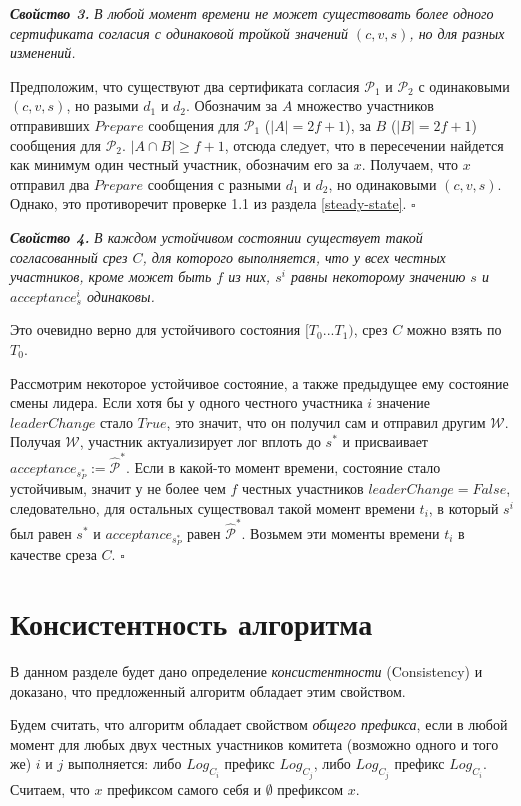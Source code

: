 \textbf{\textit{Свойство 3.}} \textit{В любой момент времени не может существовать более одного сертификата согласия с одинаковой тройкой значений $(c, v, s)$, но для разных изменений.} 

Предположим, что существуют два сертификата согласия $\mathcal{P}_1$ и $\mathcal{P}_2$ с одинаковыми $(c, v, s)$, но разыми $d_1$ и $d_2$. 
Обозначим за $A$ множество участников отправивших $Prepare$ сообщения для  $\mathcal{P}_1$ ($|A|=2f+1$), за $B$ ($|B|=2f+1$) сообщения для $\mathcal{P}_2$. $|A \cap B| \ge f+1$, отсюда следует, что в пересечении найдется как минимум один честный участник,  обозначим его за $x$. Получаем, что $x$ отправил два $Prepare$ сообщения с разными $d_1$ и $d_2$, но одинаковыми $(c, v, s)$. Однако, это противоречит проверке 1.1 из раздела \ref{steady-state}. $\square$
\vspace{10pt}

\textbf{\textit{Свойство 4.}} \textit{В каждом устойчивом состоянии существует такой согласованный срез $C$, для которого выполняется, что у всех честных участников, кроме может быть $f$ из них, $s^i$ равны некоторому значению $s$ и $acceptance^i_s$ одинаковы.}

Это очевидно верно для устойчивого состояния $[T_0...T_1)$, срез $C$ можно взять по $T_0$.

Рассмотрим некоторое устойчивое состояние, а также предыдущее ему состояние смены лидера.
Если хотя бы у одного честного участника $i$ значение $leaderChange$ стало $True$, это значит, что он получил сам и отправил другим $\mathcal{W}$. Получая $\mathcal{W}$, участник актуализирует лог вплоть до $s^{*}$ и присваивает $acceptance_{s_P^{*}} := \hat{\mathcal{P}}^{*}$. Если в какой-то момент времени, состояние стало устойчивым, значит у не более чем $f$ честных участников $leaderChange = False$, следовательно, для остальных существовал такой момент времени $t_i$, в который $s^i$ был равен $s^{*}$ и $acceptance_{s_P^{*}}$ равен $\hat{\mathcal{P}}^{*}$. Возьмем эти моменты времени $t_i$ в качестве среза $C$. $\square$

\section{Консистентность алгоритма}
В данном разделе будет дано определение \textit{консистентности} (Consistency)\cite{hybrid-consensus} и доказано, что предложенный алгоритм обладает этим свойством.

Будем считать, что алгоритм обладает свойством \textit{общего префикса}, если в любой момент для любых двух честных участников комитета (возможно одного и того же) $i$ и $j$ выполняется: либо $Log_{C_i}$ префикс $Log_{C_j}$, либо $Log_{C_j}$ префикс $Log_{C_i}$. Считаем, что $x$ префиксом самого себя и $\emptyset$ префиксом $x$.

